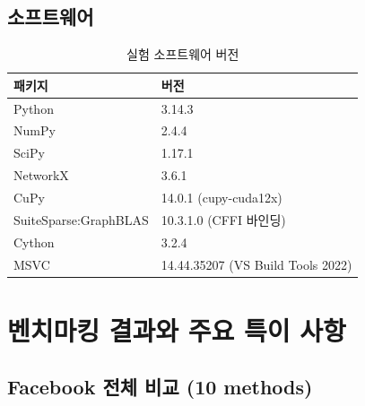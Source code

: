 \documentclass[11pt,a4paper]{article}
\begin{document}
\subsection{소프트웨어}
\begin{table}[H]\centering
\caption{실험 소프트웨어 버전}
\begin{tabular}{@{}ll@{}}
\toprule
\textbf{패키지} & \textbf{버전} \\
\midrule
Python & 3.14.3 \\
NumPy & 2.4.4 \\
SciPy & 1.17.1 \\
NetworkX & 3.6.1 \\
CuPy & 14.0.1 (cupy-cuda12x) \\
SuiteSparse:GraphBLAS & 10.3.1.0 (CFFI 바인딩) \\
Cython & 3.2.4 \\
MSVC & 14.44.35207 (VS Build Tools 2022) \\
\bottomrule
\end{tabular}
\end{table}

\section{벤치마킹 결과와 주요 특이 사항}

\subsection{Facebook 전체 비교 (10 methods)}
\end{document}
